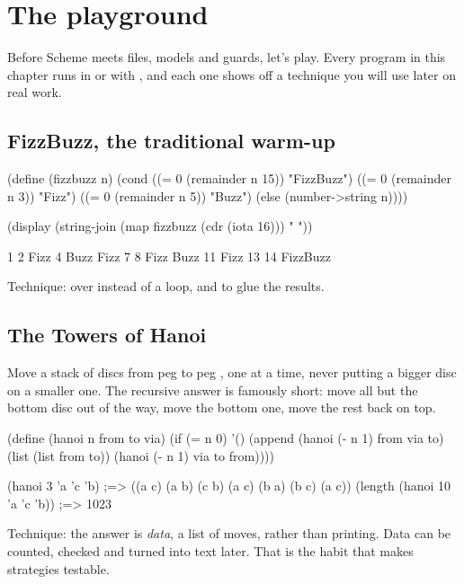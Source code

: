 \chapter{The playground}
\label{ch:playground}

Before Scheme meets files, models and guards, let's play. Every program in
this chapter runs in  or with , and
each one shows off a technique you will use later on real work.

\section{FizzBuzz, the traditional warm-up}

\begin{scm}
(define (fizzbuzz n)
  (cond ((= 0 (remainder n 15)) "FizzBuzz")
        ((= 0 (remainder n 3)) "Fizz")
        ((= 0 (remainder n 5)) "Buzz")
        (else (number->string n))))

(display (string-join (map fizzbuzz (cdr (iota 16))) " "))
\end{scm}

\begin{txt}
1 2 Fizz 4 Buzz Fizz 7 8 Fizz Buzz 11 Fizz 13 14 FizzBuzz
\end{txt}

Technique:  over  instead of a loop, and
 to glue the results.

\section{The Towers of Hanoi}

Move a stack of discs from peg  to peg , one at a time, never
putting a bigger disc on a smaller one. The recursive answer is famously
short: move all but the bottom disc out of the way, move the bottom one,
move the rest back on top.

\begin{scm}
(define (hanoi n from to via)
  (if (= n 0)
      '()
      (append (hanoi (- n 1) from via to)
              (list (list from to))
              (hanoi (- n 1) via to from))))

(hanoi 3 'a 'c 'b)
;=> ((a c) (a b) (c b) (a c) (b a) (b c) (a c))
(length (hanoi 10 'a 'c 'b))      ;=> 1023
\end{scm}

Technique: the answer is \emph{data}, a list of moves, rather than
printing. Data can be counted, checked and turned into text later. That is
the habit that makes strategies testable.

